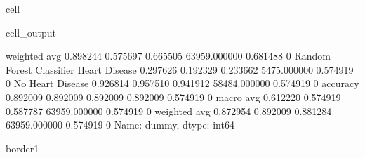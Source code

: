 \documentclass[letterpaper,10pt,english]{jupyterBook}
\begin{document}
\begin{sphinxuseclass}{cell}
\begin{sphinxVerbatimOutput}
\begin{sphinxuseclass}{cell_output}
\begin{sphinxVerbatim}[commandchars=\\\{\}]
                           weighted avg      0.898244   0.575697  0.665505  63959.000000  0.681488    0
Random Forest Classifier   Heart Disease     0.297626   0.192329  0.233662  5475.000000   0.574919    0
                           No Heart Disease  0.926814   0.957510  0.941912  58484.000000  0.574919    0
                           accuracy          0.892009   0.892009  0.892009  0.892009      0.574919    0
                           macro avg         0.612220   0.574919  0.587787  63959.000000  0.574919    0
                           weighted avg      0.872954   0.892009  0.881284  63959.000000  0.574919    0
Name: dummy, dtype: int64

border1
\PYGZhy{}\PYGZhy{}\PYGZhy{}\PYGZhy{}\PYGZhy{}\PYGZhy{}\PYGZhy{}\PYGZhy{}\PYGZhy{}\PYGZhy{}\PYGZhy{}\PYGZhy{}\PYGZhy{}\PYGZhy{}\PYGZhy{}\PYGZhy{}\PYGZhy{}\PYGZhy{}\PYGZhy{}
\end{sphinxVerbatim}

\noindent{}


\end{sphinxuseclass}
\end{sphinxVerbatimOutput}
\end{sphinxuseclass}
\end{document}
